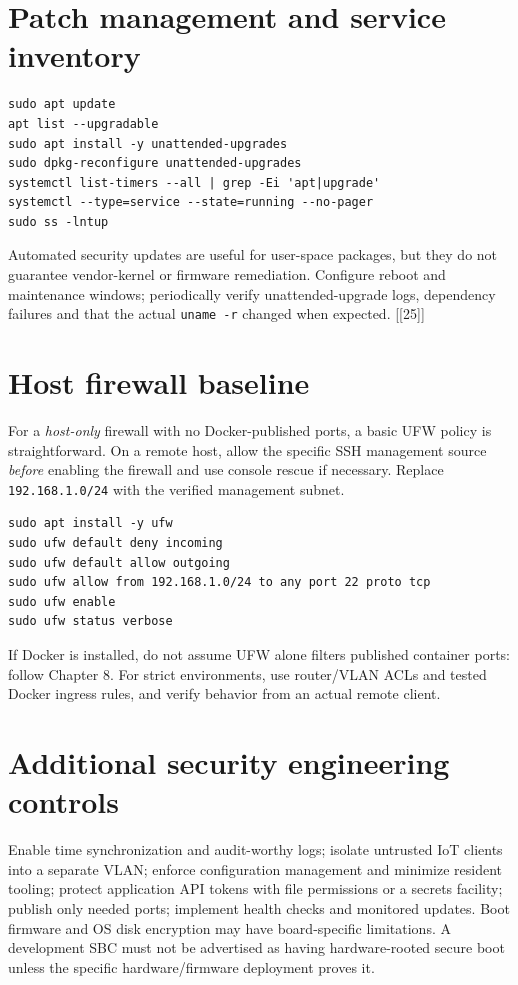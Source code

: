 \documentclass[10pt,oneside,openany]{report}
\newcommand{\code}[1]{\texttt{#1}}
\newcommand{\smallref}[1]{{\sffamily\scriptsize\color{slate}[#1]}}
\begin{document}
\section{Patch management and service inventory}
\begin{lstlisting}[style=sh]
sudo apt update
apt list --upgradable
sudo apt install -y unattended-upgrades
sudo dpkg-reconfigure unattended-upgrades
systemctl list-timers --all | grep -Ei 'apt|upgrade'
systemctl --type=service --state=running --no-pager
sudo ss -lntup
\end{lstlisting}
Automated security updates are useful for user-space packages, but they do not guarantee vendor-kernel or firmware remediation. Configure reboot and maintenance windows; periodically verify unattended-upgrade logs, dependency failures and that the actual \code{uname -r} changed when expected. \smallref{[25]}
\section{Host firewall baseline}
For a \emph{host-only} firewall with no Docker-published ports, a basic UFW policy is straightforward. On a remote host, allow the specific SSH management source \emph{before} enabling the firewall and use console rescue if necessary. Replace \code{192.168.1.0/24} with the verified management subnet.
\begin{lstlisting}[style=sh]
sudo apt install -y ufw
sudo ufw default deny incoming
sudo ufw default allow outgoing
sudo ufw allow from 192.168.1.0/24 to any port 22 proto tcp
sudo ufw enable
sudo ufw status verbose
\end{lstlisting}
If Docker is installed, do not assume UFW alone filters published container ports: follow Chapter 8. For strict environments, use router/VLAN ACLs and tested Docker ingress rules, and verify behavior from an actual remote client.
\section{Additional security engineering controls}
Enable time synchronization and audit-worthy logs; isolate untrusted IoT clients into a separate VLAN; enforce configuration management and minimize resident tooling; protect application API tokens with file permissions or a secrets facility; publish only needed ports; implement health checks and monitored updates. Boot firmware and OS disk encryption may have board-specific limitations. A development SBC must not be advertised as having hardware-rooted secure boot unless the specific hardware/firmware deployment proves it.
\end{document}
